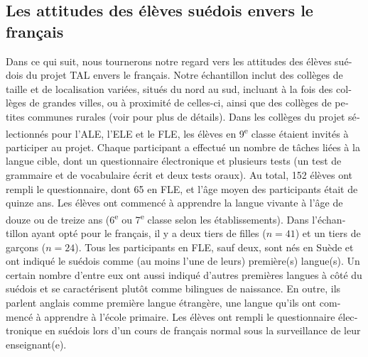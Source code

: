 \documentclass[french, output=paper]{langscibook}
\begin{document}
\begin{otherlanguage}{french}
\subsection{Les attitudes des élèves suédois envers le français}\label{sec:granfeldt:5.2}\largerpage

Dans ce qui suit, nous tournerons notre regard vers les attitudes des élèves suédois du projet TAL envers le français. Notre échantillon inclut des collèges de taille et de localisation variées, situés du nord au sud, incluant à la fois des collèges de grandes villes, ou à proximité de celles-ci, ainsi que des collèges de petites communes rurales (voir \citealt{GranfeldtEtAl2019} pour plus de détails). Dans les collèges du projet sélectionnés pour l’ALE, l’ELE et le FLE, les élèves en 9\textsuperscript{e} classe étaient invités à participer au projet. Chaque participant a effectué un nombre de tâches liées à la langue cible, dont un questionnaire électronique et plusieurs tests (un test de grammaire et de vocabulaire écrit et deux tests oraux). Au total, 152 élèves ont rempli le questionnaire, dont 65 en FLE, et l’âge moyen des participants était de quinze ans. Les élèves ont commencé à apprendre la langue vivante à l’âge de douze ou de treize ans (6\textsuperscript{e} ou 7\textsuperscript{e} classe selon les établissements). Dans l’échantillon ayant opté pour le français, il y a deux tiers de filles ($n=41$) et un tiers de garçons ($n=24$). Tous les participants en FLE, sauf deux, sont nés en Suède et ont indiqué le suédois comme (au moins l’une de leurs) première(s) langue(s). Un certain nombre d’entre eux ont aussi indiqué d’autres premières langues à côté du suédois et se caractérisent plutôt comme bilingues de naissance. En outre, ils parlent anglais comme première langue étrangère, une langue qu’ils ont commencé à apprendre à l’école primaire. Les élèves ont rempli le questionnaire électronique en suédois lors d’un cours de français normal sous la surveillance de leur enseignant(e).


\end{otherlanguage}
\end{document}
